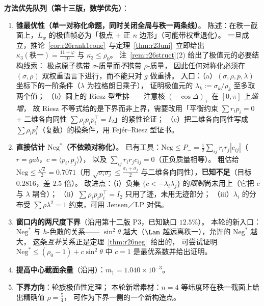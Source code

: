 \textbf{方法优先队列（第十三版，数学优先）}：
\begin{enumerate}\itemsep2pt
\item[\textbf{P1}] \textbf{锥最优性（单一对称化命题，同时关闭全局与秩一两条线）}。
陈述：在秩一截面上，$L_w$ 的极值帧必为「极点 $+$ 正 $n$ 边形」（可能带权重退化）。
一旦成立，推论~\ref{cor:r26rank1cone}~与定理~\ref{thm:r23uni}~立即给出
$\kappa_3(\text{秩一})=\frac{11+\varphi}{10}$ 与 $\kappa_3\le\rho_0$。
注~\ref{rem:r26struct}(2) 给出了极值元的必要结构线索：
极点原子携带 $\sigma$-质量而\emph{不}携带 $\rho$-质量，
因此任何对称化必须在 $(\sigma,\rho)$ 双权重语言下进行，而不能只对 $g$ 做重排。
入口：（a）$(\sigma,\rho,p,\lambda)$ 坐标下的一阶条件（$\lambda$ 为拉格朗日乘子），
证明极值元的 $\lambda_k:=\sigma_k/\rho_k$ 至多取两个值；
（b）圆上的 Riesz 型重排——注意核 $(-\cos\Delta)_+$ 在 $[0,\pi]$ 上\emph{递增}，
故 Riesz 不等式给的是下界而非上界，需要改用「平衡约束 $\sum r_ip_i=0$ $+$ 二维各向同性
$\sum\rho_ip_ip_i^\top=I_2$」的紧性论证；
（c）把二维各向同性写成 $\sum\rho_ip_i^2$（复数）的模条件，用 Fej\'er--Riesz 型证书。
\item[\textbf{P2}] \textbf{直接估计 $\mathrm{Neg}^*$（不依赖对称化）}。
已有工具：$\mathrm{Neg}\le P_-=\frac12\sum_{ij}r_ir_j|c_{ij}|$（$r=gab$，$c=\langle p_i,p_j\rangle$），
以及 $\sum_{ij}r_ir_jc_{ij}=0$（正负质量相等）。
粗估给 $\mathrm{Neg}\le\frac{\sqrt2}2=0.7071$（用 $\sqrt{\sigma_i\sigma_j}\le\frac{\sigma_i+\sigma_j}2$
与二维各向同性），\textbf{已知不足}（目标 $0.2816$，差 $2.5$ 倍）。
改进点：（i）负集 $\{c<-\lambda_i\lambda_j\}$ 的\emph{限制}尚未用上（它把 $c$ 与 $\lambda$ 耦合）；
（ii）$\sum\rho_ip_ip_i^\top=I_2$ 只用了迹，未用无迹部分；
（iii）$\lambda_i$ 的分布受 $\sum\rho\lambda^2=1$ 约束，可用 Jensen／LP 对偶。
\item[\textbf{P3}] \textbf{窗口内的两尺度下界}（沿用第十二版 P3，已知缺口 $12.5\%$）。
本轮的新入口：$\mathrm{Neg}^*$ 与 $h$-色散的关系——
$\sin^2\theta$ 越大（$\Lam$ 越远离秩一），允许的 $\mathrm{Neg}^*$ 越大，
这条\emph{互补}关系正是定理~\ref{thm:r26neg}~给出的，
可尝试证明 $\mathrm{Neg}^*\le(\rho_0-1)+c\sin^2\theta$ 中 $c=1$ 是最优系数并给出证明。
\item[\textbf{P4}] \textbf{提高中心截面余量}（沿用）：$m_1=1.040\times10^{-3}$。
\item[\textbf{副}] \textbf{下界方向}：轮族极值性定理；
本轮新增素材：$n=4$ 等纬度环在秩一截面上给出精确值 $\rho=\frac54$，
可作为下界一侧的一个新构造点。
\end{enumerate}

